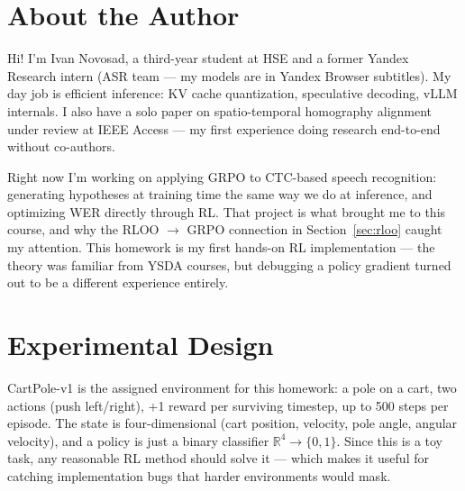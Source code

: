\documentclass{article}
\begin{document}

\section*{About the Author}

Hi! I'm Ivan Novosad, a third-year student at HSE and a former Yandex Research 
intern (ASR team — my models are in Yandex Browser subtitles). My day job is 
efficient inference: KV cache quantization, speculative decoding, vLLM internals. 
I also have a solo paper on spatio-temporal homography alignment under review at 
IEEE Access — my first experience doing research end-to-end without co-authors.

Right now I'm working on applying GRPO to CTC-based speech recognition: generating 
hypotheses at training time the same way we do at inference, and optimizing WER 
directly through RL. That project is what brought me to this course, and why the 
RLOO $\to$ GRPO connection in Section~\ref{sec:rloo} caught my attention. This 
homework is my first hands-on RL implementation — the theory was familiar from YSDA 
courses, but debugging a policy gradient turned out to be a different experience 
entirely.

\section{Experimental Design}
\label{sec:setup}

CartPole-v1 is the assigned environment for this homework: a pole on a cart, two actions (push left/right), +1 reward per surviving timestep, up to 500 steps per episode.
The state is four-dimensional (cart position, velocity, pole angle, angular velocity), and a policy is just a binary classifier $\mathbb{R}^4 \to \{0,1\}$.
Since this is a toy task, any reasonable RL method should solve it --- which makes it useful for catching implementation bugs that harder environments would mask.
\end{document}
